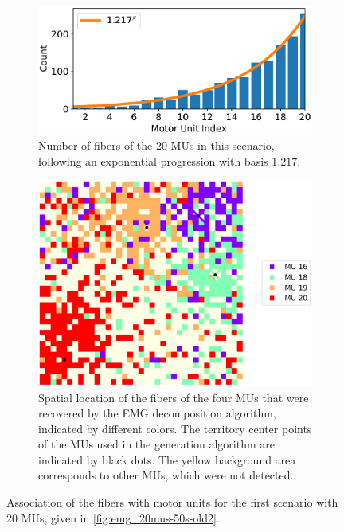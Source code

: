 \begin{figure}
  \centering%
  \begin{subfigure}[t]{0.45\textwidth}%
    \centering%
    \includegraphics[width=\textwidth]{images/results/application/oldmus2.pdf}%
    \caption{Number of fibers of the 20 MUs in this scenario, following an exponential progression with basis $1.217$.}%
    \label{fig:oldmus_progression}%
  \end{subfigure}\hfill
  \begin{subfigure}[t]{0.45\textwidth}%
    \centering%
    \includegraphics[width=\textwidth]{images/results/application/oldmus1.pdf}%
    \caption{Spatial location of the fibers of the four MUs that were recovered by the EMG decomposition algorithm, indicated by different colors. The territory center points of the MUs used in the generation algorithm are indicated by black dots. The yellow background area corresponds to other MUs, which were not detected.}%
    \label{fig:oldmus_2d}%
  \end{subfigure}
  \caption{Association of the fibers with motor units for the first scenario with 20 MUs, given in \cref{fig:emg_20mus-50s-old2}.}%
  \label{fig:oldmus}%
\end{figure}

